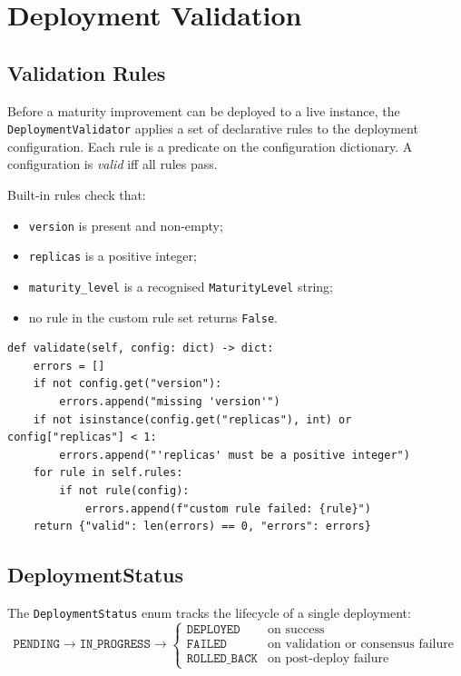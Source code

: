 \documentclass[11pt]{article}
\begin{document}
\section{Deployment Validation}\label{sec:deployment}

\subsection{Validation Rules}

Before a maturity improvement can be deployed to a live instance, the
\texttt{DeploymentValidator} applies a set of declarative rules to the
deployment configuration.  Each rule is a predicate on the configuration
dictionary.  A configuration is \emph{valid} iff all rules pass.

Built-in rules check that:
\begin{itemize}
  \item \texttt{version} is present and non-empty;
  \item \texttt{replicas} is a positive integer;
  \item \texttt{maturity\_level} is a recognised \texttt{MaturityLevel} string;
  \item no rule in the custom rule set returns \texttt{False}.
\end{itemize}

\begin{lstlisting}[style=jugeo-python, caption={DeploymentValidator.validate (simplified).}]
def validate(self, config: dict) -> dict:
    errors = []
    if not config.get("version"):
        errors.append("missing 'version'")
    if not isinstance(config.get("replicas"), int) or config["replicas"] < 1:
        errors.append("'replicas' must be a positive integer")
    for rule in self.rules:
        if not rule(config):
            errors.append(f"custom rule failed: {rule}")
    return {"valid": len(errors) == 0, "errors": errors}
\end{lstlisting}

\subsection{DeploymentStatus}

The \texttt{DeploymentStatus} enum tracks the lifecycle of a single
deployment:
\[
  \texttt{PENDING} \to \texttt{IN\_PROGRESS} \to
  \begin{cases}
    \texttt{DEPLOYED} & \text{on success} \\
    \texttt{FAILED}   & \text{on validation or consensus failure} \\
    \texttt{ROLLED\_BACK} & \text{on post-deploy failure}
  \end{cases}
\]
\end{document}
